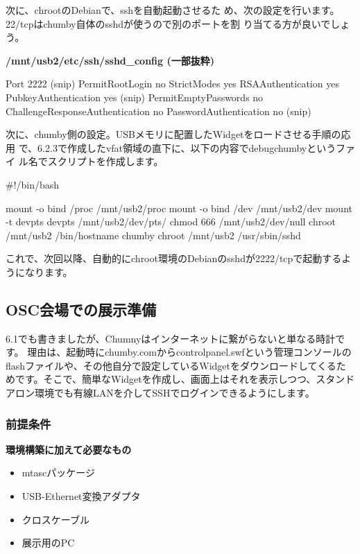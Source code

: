 \documentclass[mingoth,a4paper]{jsarticle}
\begin{document}
次に、chrootのDebianで、sshを自動起動させるた
め、次の設定を行います。22/tcpはchumby自体のsshdが使うので別のポートを割
り当てる方が良いでしょう。

\textbf{/mnt/usb2/etc/ssh/sshd\_config (一部抜粋)}
\begin{commandline}
Port 2222
(snip)
PermitRootLogin no
StrictModes yes
RSAAuthentication yes
PubkeyAuthentication yes
(snip)
PermitEmptyPasswords no
ChallengeResponseAuthentication no
PasswordAuthentication no
(snip)
\end{commandline}
次に、chumby側の設定。USBメモリに配置したWidgetをロードさせる手順の応用
で、6.2.3で作成したvfat領域の直下に、以下の内容でdebugchumbyというファイ
ル名でスクリプトを作成します。
\begin{commandline}
#!/bin/bash

mount -o bind /proc /mnt/usb2/proc
mount -o bind /dev  /mnt/usb2/dev
mount -t devpts devpts /mnt/usb2/dev/pts/
chmod 666 /mnt/usb2/dev/null
chroot /mnt/usb2 /bin/hostname chumby
chroot /mnt/usb2 /usr/sbin/sshd
\end{commandline}
これで、次回以降、自動的にchroot環境のDebianのsshdが2222/tcpで起動するよ
うになります。

\subsection{OSC会場での展示準備}
6.1でも書きましたが、Chumnyはインターネットに繋がらないと単なる時計です。
理由は、起動時にchumby.comからcontrolpanel.swfという管理コンソールの
flashファイルや、その他自分で設定しているWidgetをダウンロードしてくるた
めです。そこで、簡単なWidgetを作成し、画面上はそれを表示しつつ、スタンド
アロン環境でも有線LANを介してSSHでログインできるようにします。

\subsubsection{前提条件}
\textbf{環境構築に加えて必要なもの}
\begin{itemize}
\item mtascパッケージ
\item USB-Ethernet変換アダプタ
\item クロスケーブル
\item 展示用のPC
\end{itemize}
\end{document}
